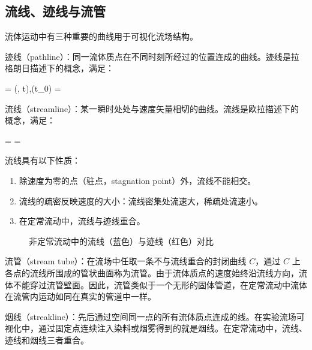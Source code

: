 \subsection{流线、迹线与流管}

流体运动中有三种重要的曲线用于可视化流场结构。

迹线（pathline）：同一流体质点在不同时刻所经过的位置连成的曲线。迹线是拉格朗日描述下的概念，满足：
\begin{myformula}
 = (, t),\quad {}(t_0) = 
\end{myformula}

流线（streamline）：某一瞬时处处与速度矢量相切的曲线。流线是欧拉描述下的概念，满足：
\begin{myformula}
 =  = 
\end{myformula}

流线具有以下性质：
\begin{enumerate}
    \item 除速度为零的点（驻点，stagnation point）外，流线不能相交。
    \item 流线的疏密反映速度的大小：流线密集处流速大，稀疏处流速小。
    \item 在定常流动中，流线与迹线重合。
\end{enumerate}

\begin{figure}[H]
\centering
{}
\caption{非定常流动中的流线（蓝色）与迹线（红色）对比}
\label{fig:streamline-pathline}
\end{figure}

流管（stream tube）：在流场中任取一条不与流线重合的封闭曲线 \(C\)，通过 \(C\) 上各点的流线所围成的管状曲面称为流管。由于流体质点的速度始终沿流线方向，流体不能穿过流管壁面。因此，流管类似于一个无形的固体管道，在定常流动中流体在流管内运动如同在真实的管道中一样。

烟线（streakline）：先后通过空间同一点的所有流体质点连成的线。在实验流场可视化中，通过固定点连续注入染料或烟雾得到的就是烟线。在定常流动中，流线、迹线和烟线三者重合。

